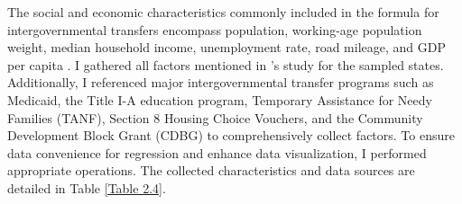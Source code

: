 

The social and economic characteristics commonly included in the formula for intergovernmental transfers encompass population, working-age population weight, median household income, unemployment rate, road mileage, and GDP per capita \parencite{dilger2015federal}. I gathered all factors mentioned in \Textcite{dilger2015federal}'s study for the sampled states. Additionally, I referenced major intergovernmental transfer programs such as Medicaid, the Title I-A education program, Temporary Assistance for Needy Families (TANF), Section 8 Housing Choice Vouchers, and the Community Development Block Grant (CDBG) to comprehensively collect factors. To ensure data convenience for regression and enhance data visualization, I performed appropriate operations. The collected characteristics and data sources are detailed in Table \ref{Table 2.4}.%

